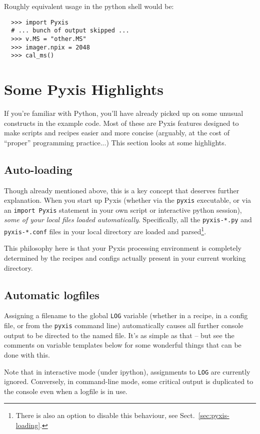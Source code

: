 \documentclass[a4paper,10pt]{article}
\begin{document}
Roughly equivalent usage in the python shell would be:

\begin{verbatim}
  >>> import Pyxis
  # ... bunch of output skipped ...
  >>> v.MS = "other.MS"
  >>> imager.npix = 2048
  >>> cal_ms()
\end{verbatim}

\section{Some Pyxis Highlights}

If you're familiar with Python, you'll have already picked up on some unusual constructs in the example code. 
Most of these are Pyxis features designed to make scripts and recipes easier and more concise (arguably, at the cost of 
``proper'' programming practice...) This section looks at some highlights. 

\subsection{Auto-loading}

Though already mentioned above, this is a key concept that deserves further explanation. When you start up Pyxis 
(whether via the {\tt pyxis} executable, or via an {\tt import Pyxis} statement in your own script or interactive python
session), {\em some of your local files loaded automatically}. Specifically, all the {\tt pyxis-*.py} and {\tt pyxis-*.conf}
files in your local directory are loaded and parsed\footnote{There is also an option to disable this behaviour, see Sect.~\ref{sec:pyxis-loading}.}. 

This philosophy here is that your Pyxis processing environment is completely determined by the recipes and configs actually
present in your current working directory. 

\subsection{Automatic logfiles}

Assigning a filename to the global {\tt LOG} variable (whether in a recipe, in a config file, or from the {\tt pyxis} command line) 
automatically causes all further console output to be directed to the named file. It's as simple as that -- but see the comments on 
variable templates below for some wonderful things that can be done with this.

Note that in interactive mode (under ipython), assignments to {\tt LOG} are currently ignored. Conversely, in 
command-line mode, some critical output is duplicated to the console even when a logfile is in use.
\end{document}

